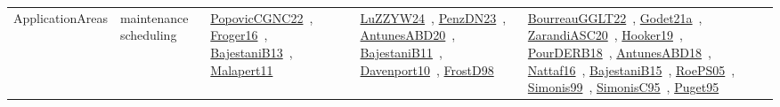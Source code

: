 {\begin{longtable}{lp{3cm}>{\raggedright\arraybackslash}p{6cm}>{\raggedright\arraybackslash}p{6cm}>{\raggedright\arraybackslash}p{8cm}}
ApplicationAreas & maintenance scheduling & \href{../works/PopovicCGNC22.pdf}{PopovicCGNC22}~\cite{PopovicCGNC22}, \href{../works/Froger16.pdf}{Froger16}~\cite{Froger16}, \href{../works/BajestaniB13.pdf}{BajestaniB13}~\cite{BajestaniB13}, \href{../works/Malapert11.pdf}{Malapert11}~\cite{Malapert11} & \href{../works/LuZZYW24.pdf}{LuZZYW24}~\cite{LuZZYW24}, \href{../works/PenzDN23.pdf}{PenzDN23}~\cite{PenzDN23}, \href{../works/AntunesABD20.pdf}{AntunesABD20}~\cite{AntunesABD20}, \href{../works/BajestaniB11.pdf}{BajestaniB11}~\cite{BajestaniB11}, \href{../works/Davenport10.pdf}{Davenport10}~\cite{Davenport10}, \href{../works/FrostD98.pdf}{FrostD98}~\cite{FrostD98} & \href{../works/BourreauGGLT22.pdf}{BourreauGGLT22}~\cite{BourreauGGLT22}, \href{../works/Godet21a.pdf}{Godet21a}~\cite{Godet21a}, \href{../works/ZarandiASC20.pdf}{ZarandiASC20}~\cite{ZarandiASC20}, \href{../works/Hooker19.pdf}{Hooker19}~\cite{Hooker19}, \href{../works/PourDERB18.pdf}{PourDERB18}~\cite{PourDERB18}, \href{../works/AntunesABD18.pdf}{AntunesABD18}~\cite{AntunesABD18}, \href{../works/Nattaf16.pdf}{Nattaf16}~\cite{Nattaf16}, \href{../works/BajestaniB15.pdf}{BajestaniB15}~\cite{BajestaniB15}, \href{../works/RoePS05.pdf}{RoePS05}~\cite{RoePS05}, \href{../works/Simonis99.pdf}{Simonis99}~\cite{Simonis99}, \href{../works/SimonisC95.pdf}{SimonisC95}~\cite{SimonisC95}, \href{../works/Puget95.pdf}{Puget95}~\cite{Puget95}\\

\end{longtable}}
